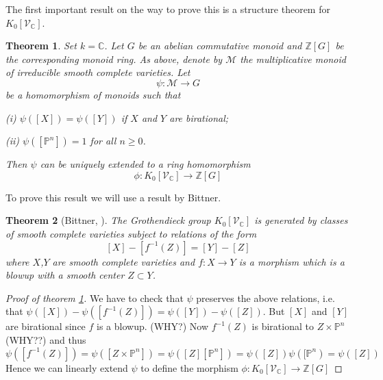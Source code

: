 \documentclass[11pt, a4paper, german]{article}
\theoremstyle{plain}
\newtheorem{theorem}{Theorem}
\theoremstyle{definition}
\newcommand{\gring}[1][k]{K_0[\mathcal{V}_#1]}
\begin{document}
The first important result on the way to prove this is a structure theorem for $\gring[\mathbb{C}]$.
\begin{theorem}
    \label{th1}
    Set $k = \mathbb{C}$. Let $G$ be an abelian commutative monoid and $\mathbb{Z}[G]$ be the corresponding monoid ring. As above, denote
    by $\mathcal{M}$ the multiplicative monoid of irreducible smooth complete varieties. Let
    \[
        \psi: \mathcal{M} \to G
    \]
    be a homomorphism of monoids such that

    (i) $\psi([X]) = \psi([Y])$ if $X$ and $Y$ are birational;

    (ii) $\psi([\mathbb{P}^n]) = 1$ for all $n \ge 0$.

    Then $\psi$ can be uniquely extended to a ring homomorphism 
    \[
        \phi: \gring[\mathbb{C}] \to \mathbb{Z} [G]
    \]
\end{theorem}

To prove this result we will use a result by Bittner. 

\begin{theorem}[Bittner, {\cite[Theorem 3.1]{Bittner}}] 
    The Grothendieck group $\gring[\mathbb{C}]$ is generated by classes of smooth complete varieties subject to relations of the form
    \[
        [X] - [f^{-1}(Z)] = [Y] - [Z]
    \]
    where $X$,$Y$ are smooth complete varieties and $f: X \to Y$ is a morphism which is a blowup with a smooth center $Z \subset Y$.
\end{theorem}
\begin{proof}[Proof of theorem \ref{th1}]
    We have to check that $\psi$ preserves the above relations, i.e. that $\psi([X]) - \psi([f^{-1}(Z)]) = \psi([Y]) - \psi([Z])$. 
    But $[X]$ and $[Y]$ are birational since $f$ is a blowup. (WHY?)
    Now $f^{-1}(Z)$ is birational to $Z \times \mathbb{P}^n$ (WHY??) and thus 
    \[
        \psi([f^{-1}(Z)]) = \psi([Z \times \mathbb{P}^n]) = \psi([Z][\mathbb{P}^n]) = \psi([Z])\psi([\mathbb{P}^n) = \psi([Z])
    \]
    Hence we can linearly extend $\psi$ to define the morphism $\phi: \gring[\mathbb{C}] \to \mathbb{Z} [G]$
\end{proof}

{}

\end{document}
